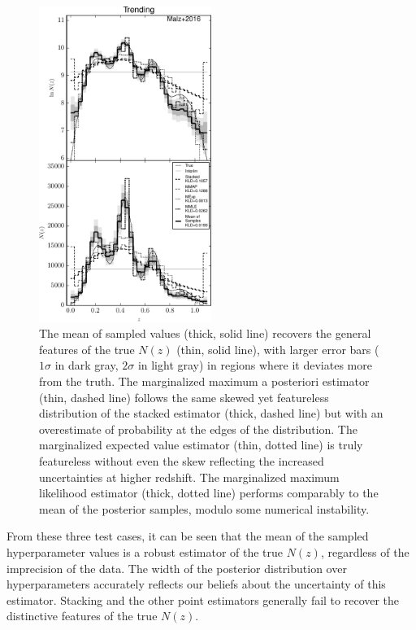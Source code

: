 \documentclass[preprint]{aastex}
\begin{document}
\begin{figure}
\includegraphics[width=0.5\textwidth]{figs/vars/comps.pdf}
\caption{The mean of sampled values (thick, solid line) recovers the general 
features of the true $N(z)$ (thin, solid line), with larger error bars 
($1\sigma$ in dark gray, $2\sigma$ in light gray) in regions where it deviates 
more from the truth.  The marginalized maximum a posteriori estimator (thin, 
dashed line) follows the same skewed yet featureless distribution of the 
stacked estimator (thick, dashed line) but with an overestimate of probability 
at the edges of the distribution.  The marginalized expected value estimator 
(thin, dotted line) is truly featureless without even the skew reflecting the 
increased uncertainties at higher redshift.  The marginalized maximum 
likelihood estimator (thick, dotted line) performs comparably to the mean of 
the posterior samples, modulo some numerical instability.}
\label{fig:vars-comp}
\end{figure}

From these three test cases, it can be seen that the mean of the sampled 
hyperparameter values is a robust estimator of the true $N(z)$, regardless of 
the imprecision of the data.  The width of the posterior distribution over 
hyperparameters accurately reflects our beliefs about the uncertainty of this 
estimator.  Stacking and the other point estimators generally fail to recover 
the distinctive features of the true $N(z)$.
\end{document}
